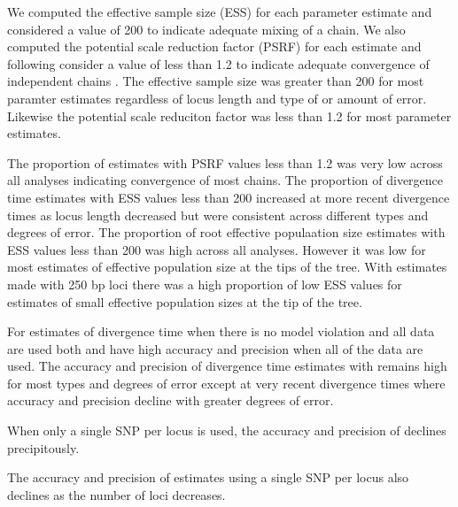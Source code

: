 We computed the effective sample size (ESS) for each parameter estimate and considered
a value of 200 to indicate adequate mixing of a chain. 
We also computed the potential scale reduction factor (PSRF) for each estimate and following 
consider a value of less than 1.2 to indicate adequate 
convergence of independent chains \citep{gelman1998}. 
The effective sample size was greater than 200 for most \ecoevolity paramter estimates
regardless of locus length and type of or amount of error. 
Likewise the potential scale reduciton factor was less than 1.2 for most \ecoevolity parameter estimates.

The proportion of estimates with PSRF values less than 1.2 was very low across 
all \beast analyses indicating convergence of most chains.
The proportion of \beast divergence time estimates with ESS values less than 200 
increased at more recent divergence times as locus length decreased but were 
consistent across different types and degrees of error.
The proportion of \beast root effective populaation size estimates with ESS 
values less than 200 was high across all analyses. However it was low for most estimates
of effective population size at the tips of the tree. With estimates made with 250 
bp loci there was a high proportion of low ESS values for estimates of small 
effective population sizes at the tip of the tree.


For estimates of divergence time when there is no model violation and all data 
are used both \ecoevolity and \beast
have high accuracy and precision when all of the data are used. The accuracy and
precision of divergence time estimates with \ecoevolity remains high for most 
types and degrees of error except at very recent divergence times where accuracy
and precision decline with greater degrees of error.

When only a single SNP per locus is used, the accuracy and precision of \ecoevolity 
declines precipitously.

The accuracy and precision of \ecoevolity estimates using a single SNP per locus 
also declines as the number of loci decreases.        
















